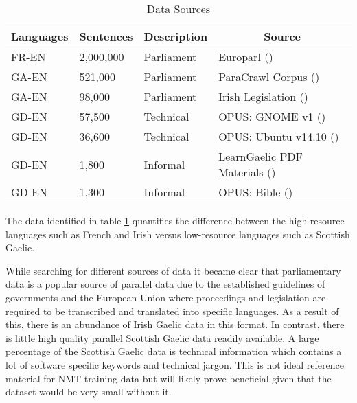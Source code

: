 \begin{table}[!ht]
\centering
\begin{tabular}{|l|l|l|l|}
\hline
\multicolumn{1}{|c|}{\textbf{Languages}} & \multicolumn{1}{c|}{\textbf{Sentences}} & \textbf{Description} & \multicolumn{1}{c|}{\textbf{Source}}                        \\ \hline
FR-EN                                    & 2,000,000                                   & Parliament           & Europarl (\cite{french_corpus_2005})                        \\ \hline
GA-EN                                    & 521,000                                     & Parliament           & ParaCrawl Corpus (\cite{irish_paracrawl_2020}) \\ \hline
GA-EN                                    & 98,000                                     & Parliament           & Irish Legislation (\cite{irish_corpus_2017}) \\ \hline
GD-EN                                    & 57,500                                   & Technical            & OPUS: GNOME v1 (\cite{tiedemann_opus_2012})                 \\ \hline
GD-EN                                    & 36,600                                 & Technical            & OPUS: Ubuntu v14.10 (\cite{tiedemann_opus_2012})            \\ \hline
GD-EN                                    & 1,800                                   & Informal             & LearnGaelic PDF Materials (\cite{learn_gaelic_2019})        \\ \hline
GD-EN                                    & 1,300                                 & Informal             & OPUS: Bible (\cite{bible_corpus_2015})                      \\ \hline

\end{tabular}
\caption{\label{tab:available-data} Data Sources}

\end{table}

The data identified in table \ref{tab:available-data} quantifies the difference between the high-resource languages such as French and Irish versus low-resource languages such as Scottish Gaelic. 

While searching for different sources of data it became clear that parliamentary data is a popular source of parallel data due to the established guidelines of governments and the European Union where proceedings and legislation are required to be transcribed and translated into specific languages. As a result of this, there is an abundance of Irish Gaelic data in this format.
In contrast, there is little high quality parallel Scottish Gaelic data readily available. A large percentage of the Scottish Gaelic data is technical information which contains a lot of software specific keywords and technical jargon. This is not ideal reference material for \acrshort{NMT} training data but will likely prove beneficial given that the dataset would be very small without it.

